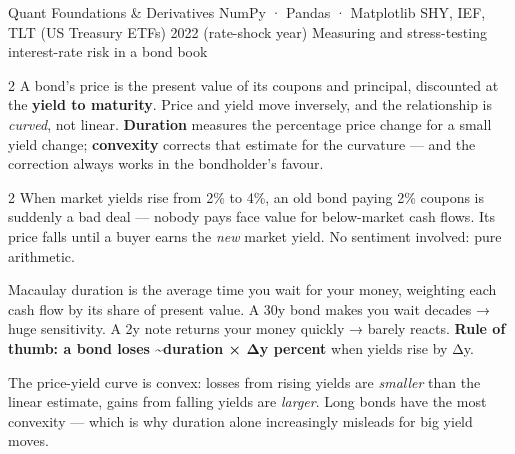 \documentclass{pyportfolios-note}
\begin{document}
\thispagestyle{notecover}





\notecard
  {Quant Foundations \& Derivatives}
  {NumPy · Pandas · Matplotlib}
  {SHY, IEF, TLT (US Treasury ETFs)}
  {2022 (rate-shock year)}
  {Measuring and stress-testing interest-rate risk in a bond book}

\noteneedroom{150bp}

\begin{multicols}{2}
A bond's price is the present value of its coupons and principal, discounted at
the \textbf{yield to maturity}. Price and yield move inversely, and the
relationship is \textit{curved}, not linear. \textbf{Duration} measures the
percentage price change for a small yield change; \textbf{convexity} corrects
that estimate for the curvature — and the correction always works in the
bondholder's favour.
\end{multicols}

\noteneedroom{170bp}

\begin{multicols}{2}
When market yields rise from 2\% to 4\%, an old bond paying 2\% coupons is
suddenly a bad deal — nobody pays face value for below-market cash flows. Its
price falls until a buyer earns the \textit{new} market yield. No sentiment
involved: pure arithmetic.

Macaulay duration is the average time you wait for your money, weighting each
cash flow by its share of present value. A 30y bond makes you wait decades →
huge sensitivity. A 2y note returns your money quickly → barely reacts.
\textbf{Rule of thumb: a bond loses \textasciitilde duration × Δy percent} when
yields rise by Δy.

The price-yield curve is convex: losses from rising yields are \textit{smaller}
than the linear estimate, gains from falling yields are \textit{larger}. Long
bonds have the most convexity — which is why duration alone increasingly
misleads for big yield moves.
\end{multicols}
\end{document}
